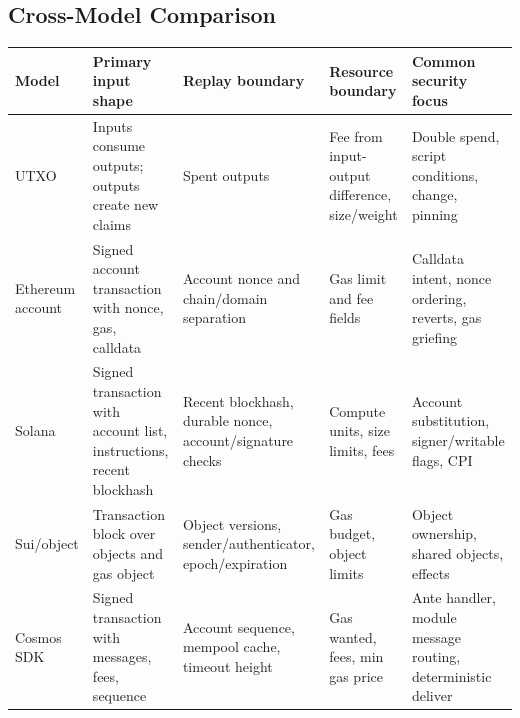 \subsection{Cross-Model Comparison}

{\def\LTcaptype{none} %
\begin{longtable}[]{@{}
  >{\raggedright\arraybackslash}p{}
  >{\raggedright\arraybackslash}p{}
  >{\raggedright\arraybackslash}p{}
  >{\raggedright\arraybackslash}p{}
  >{\raggedright\arraybackslash}p{}@{}}
\toprule\noalign{}
\begin{minipage}[b]{\linewidth}\raggedright
Model
\end{minipage} & \begin{minipage}[b]{\linewidth}\raggedright
Primary input shape
\end{minipage} & \begin{minipage}[b]{\linewidth}\raggedright
Replay boundary
\end{minipage} & \begin{minipage}[b]{\linewidth}\raggedright
Resource boundary
\end{minipage} & \begin{minipage}[b]{\linewidth}\raggedright
Common security focus
\end{minipage} \\
\midrule\noalign{}
\endhead
\bottomrule\noalign{}
\endlastfoot
UTXO & Inputs consume outputs; outputs create new claims & Spent outputs
& Fee from input-output difference, size/weight & Double spend, script
conditions, change, pinning \\
Ethereum account & Signed account transaction with nonce, gas, calldata
& Account nonce and chain/domain separation & Gas limit and fee fields &
Calldata intent, nonce ordering, reverts, gas griefing \\
Solana & Signed transaction with account list, instructions, recent
blockhash & Recent blockhash, durable nonce, account/signature checks &
Compute units, size limits, fees & Account substitution, signer/writable
flags, CPI \\
Sui/object & Transaction block over objects and gas object & Object
versions, sender/authenticator, epoch/expiration & Gas budget, object
limits & Object ownership, shared objects, effects \\
Cosmos SDK & Signed transaction with messages, fees, sequence & Account
sequence, mempool cache, timeout height & Gas wanted, fees, min gas
price & Ante handler, module message routing, deterministic deliver \\
\end{longtable}
}

